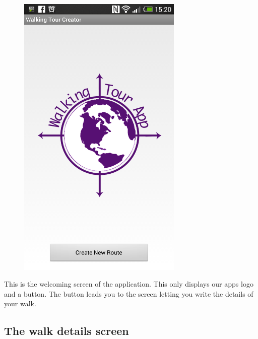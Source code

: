 \documentclass{project}
\begin{document}
\begin{figure}
  \begin{center}
    \includegraphics[width=0.7\textwidth]{front}
  \end{center}
\end{figure}

This is the welcoming screen of the application.
\newline
This only displays our apps logo and a button.
The button leads you to the screen letting you write the details of your walk.

\clearpage

\subsection{The walk details screen}
\end{document}
